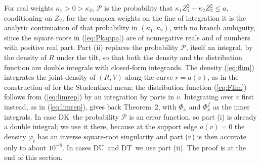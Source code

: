 \documentclass[ecta,nameyear,final,supplement]{econsocart}
\newcommand{\Fk}{\textsf{\upshape DK}}
\newcommand{\Fu}{\textsf{\upshape DU}}
\newcommand{\Ft}{\textsf{\upshape DT}}
\newcommand{\cP}{\mathcal{P}}
\theoremstyle{plain}
\theoremstyle{definition}
\begin{document}
For real weights $\kappa_1>0>\kappa_2$, $\cP$ is the probability that $\kappa_1Z_1^2+\kappa_2Z_2^2\le a$, conditioning on $Z_2$; for the complex weights on the line of integration it is the analytic continuation of that probability in $(\kappa_1,\kappa_2)$, with no branch ambiguity, since the square roots in (\ref{eq:Pkappa}) are of nonnegative reals and of numbers with positive real part.  Part (ii) replaces the probability $\cP$, itself an integral, by the density of $R$ under the tilt, so that both the density and the distribution function are double integrals with closed-form integrands.  The density (\ref{eq:flim}) integrates the joint density of $(R,V)$ along the curve $r=a(v)$, as in the construction of \cite{DanielsYoung1991} for the Studentized mean; the distribution function (\ref{eq:Flim}) follows from (\ref{eq:limrep}) by an integration by parts in $v$.  Integrating over $v$ first instead, as in (\ref{eq:limrep}), gives back Theorem~2, with $\Phi_x$ and $\Phi^f_x$ as the inner integrals.  In case \Fk\ the probability $\cP$ is an error function, so part (i) is already a double integral; we use it there, because at the support edge $a(v)=0$ the density $\varphi_t$ has an inverse square-root singularity and part (ii) is then accurate only to about $10^{-8}$.  In cases \Fu\ and \Ft\ we use part (ii).  The proof is at the end of this section.
\end{document}
